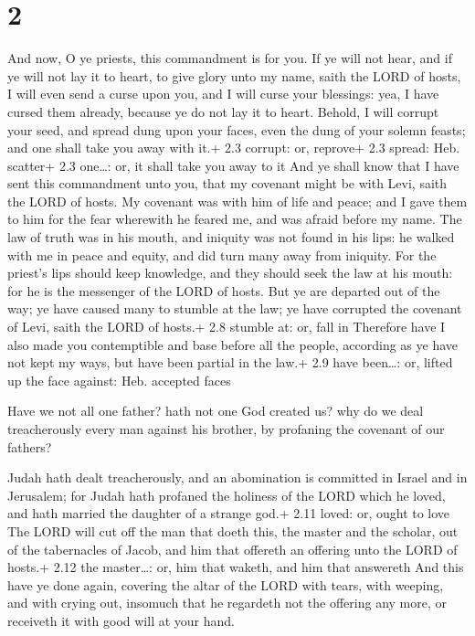 \hypertarget{section-1}{%
\section{2}\label{section-1}}

 And now, O ye priests, this commandment is for you.
 If ye will not hear, and if ye will not lay it to heart, to
give glory unto my name, saith the LORD of hosts, I will even send a
curse upon you, and I will curse your blessings: yea, I have cursed them
already, because ye do not lay it to heart.  Behold, I will
corrupt your seed, and spread dung upon your faces, even the dung of
your solemn feasts; and one shall take you away with it.+ 2.3 corrupt:
or, reprove+ 2.3 spread: Heb. scatter+ 2.3 one\ldots: or, it shall take
you away to it  And ye shall know that I have sent this
commandment unto you, that my covenant might be with Levi, saith the
LORD of hosts.  My covenant was with him of life and peace;
and I gave them to him for the fear wherewith he feared me, and was
afraid before my name.  The law of truth was in his mouth,
and iniquity was not found in his lips: he walked with me in peace and
equity, and did turn many away from iniquity.  For the
priest's lips should keep knowledge, and they should seek the law at his
mouth: for he is the messenger of the LORD of hosts.  But ye
are departed out of the way; ye have caused many to stumble at the law;
ye have corrupted the covenant of Levi, saith the LORD of hosts.+ 2.8
stumble at: or, fall in  Therefore have I also made you
contemptible and base before all the people, according as ye have not
kept my ways, but have been partial in the law.+ 2.9 have been\ldots:
or, lifted up the face against: Heb. accepted faces

 Have we not all one father? hath not one God created us?
why do we deal treacherously every man against his brother, by profaning
the covenant of our fathers?

 Judah hath dealt treacherously, and an abomination is
committed in Israel and in Jerusalem; for Judah hath profaned the
holiness of the LORD which he loved, and hath married the daughter of a
strange god.+ 2.11 loved: or, ought to love  The LORD will
cut off the man that doeth this, the master and the scholar, out of the
tabernacles of Jacob, and him that offereth an offering unto the LORD of
hosts.+ 2.12 the master\ldots: or, him that waketh, and him that
answereth  And this have ye done again, covering the altar
of the LORD with tears, with weeping, and with crying out, insomuch that
he regardeth not the offering any more, or receiveth it with good will
at your hand.

